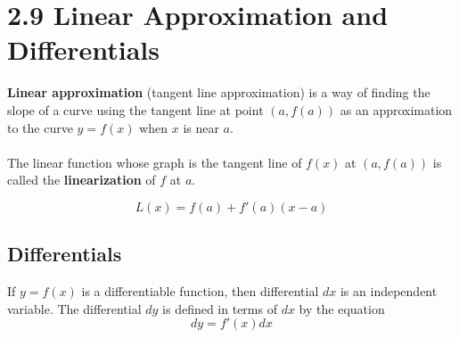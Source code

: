 %
%

\section*{2.9 Linear Approximation and Differentials}

\textbf{Linear approximation} (tangent line approximation) is a way of finding the slope of a curve using the tangent line at point \((a, f(a))\) as an approximation to the curve \(y=f(x)\) when \(x\) is near \(a\).\\\\
The linear function whose graph is the tangent line of \(f(x)\) at \((a, f(a))\) is called the \textbf{linearization} of \(f\) at \(a\).

$$ L(x) = f(a) + f'(a)(x-a) $$

\subsection*{Differentials}

If \(y=f(x)\) is a differentiable function, then differential \(dx\) is an independent variable. The differential \(dy\) is defined in terms of \(dx\) by the equation
$$ dy=f'(x)dx $$
